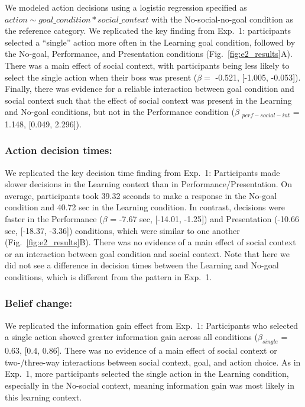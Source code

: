 \documentclass[10pt, letterpaper]{article}
\begin{document}
We modeled action decisions using a logistic regression specified as
\texttt{$action \sim goal\_condition * social\_context$} with the
No-social-no-goal condition as the reference category. We replicated the
key finding from Exp.~1: participants selected a ``single'' action more
often in the Learning goal condition, followed by the No-goal,
Performance, and Presentation conditions (Fig.~\ref{fig:e2_results}A).
There was a main effect of social context, with participants being less
likely to select the single action when their boss was present
(\(\beta =\) -0.521, {[}-1.005, -0.053{]}). Finally, there was evidence
for a reliable interaction between goal condition and social context
such that the effect of social context was present in the Learning and
No-goal conditions, but not in the Performance condition (\(\beta\)
\(_{perf-social-int}\) = 1.148, {[}0.049, 2.296{]}).

\hypertarget{action-decision-times-1}{%
\subsubsection{Action decision times:}\label{action-decision-times-1}}

We replicated the key decision time finding from Exp.~1: Participants
made slower decisions in the Learning context than in
Performance/Presentation. On average, participants took 39.32 seconds to
make a response in the No-goal condition and 40.72 sec in the Learning
condition. In contrast, decisions were faster in the Performance
(\(\beta\) = -7.67 sec, {[}-14.01, -1.25{]}) and Presentation (-10.66
sec, {[}-18.37, -3.36{]}) conditions, which were similar to one another
(Fig.~\ref{fig:e2_results}B). There was no evidence of a main effect of
social context or an interaction between goal condition and social
context. Note that here we did not see a difference in decision times
between the Learning and No-goal conditions, which is different from the
pattern in Exp.~1.

\hypertarget{belief-change-1}{%
\subsubsection{Belief change:}\label{belief-change-1}}

We replicated the information gain effect from Exp.~1: Participants who
selected a single action showed greater information gain across all
conditions (\(\beta_{single}\) = 0.63, {[}0.4, 0.86{]}. There was no
evidence of a main effect of social context or two-/three-way
interactions between social context, goal, and action choice. As in
Exp.~1, more participants selected the single action in the Learning
condition, especially in the No-social context, meaning information gain
was most likely in this learning context.
\end{document}
